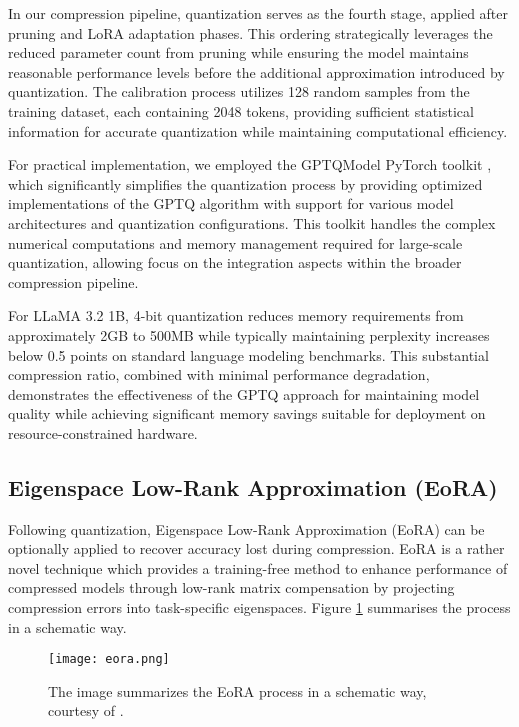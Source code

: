 In our compression pipeline, quantization serves as the fourth stage, applied after pruning and LoRA adaptation phases. This ordering strategically leverages the reduced parameter count from pruning while ensuring the model maintains reasonable performance levels before the additional approximation introduced by quantization. The calibration process utilizes 128 random samples from the training dataset, each containing 2048 tokens, providing sufficient statistical information for accurate quantization while maintaining computational efficiency.

For practical implementation, we employed the GPTQModel PyTorch toolkit \cite{gptqmodel}, which significantly simplifies the quantization process by providing optimized implementations of the GPTQ algorithm with support for various model architectures and quantization configurations. This toolkit handles the complex numerical computations and memory management required for large-scale quantization, allowing focus on the integration aspects within the broader compression pipeline.

For LLaMA 3.2 1B, 4-bit quantization reduces memory requirements from approximately 2GB to 500MB while typically maintaining perplexity increases below 0.5 points on standard language modeling benchmarks. This substantial compression ratio, combined with minimal performance degradation, demonstrates the effectiveness of the GPTQ approach for maintaining model quality while achieving significant memory savings suitable for deployment on resource-constrained hardware.

\subsection{Eigenspace Low-Rank Approximation (EoRA)} \label{eora}

Following quantization, Eigenspace Low-Rank Approximation (EoRA) \cite{eora} can be optionally applied to recover accuracy lost during compression. EoRA is a rather novel technique which provides a training-free method to enhance performance of compressed models through low-rank matrix compensation by projecting compression errors into task-specific eigenspaces. Figure \ref{fig:eora} summarises the process in a schematic way.


\begin{figure}[htbp]
    \centering
    \texttt{[image: eora.png]}
    \caption[EoRA Representation]{The image summarizes the EoRA process in a schematic way, courtesy of \cite{eora}.}
    \label{fig:eora}
\end{figure}


